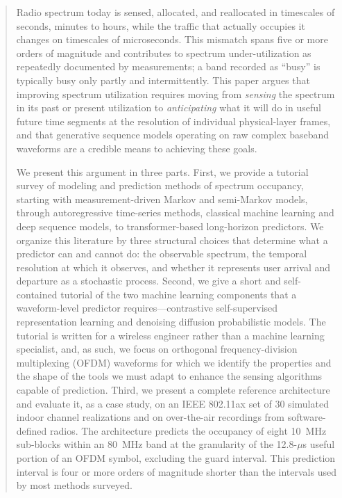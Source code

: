 \documentclass[lettersize,journal]{IEEEtran}
\begin{document}
\begin{abstract}
Radio spectrum today is sensed, allocated, and reallocated in timescales of
seconds, minutes to hours, while the traffic that actually occupies it changes on
timescales of microseconds. This mismatch spans five or more orders of
magnitude and contributes to spectrum under-utilization as repeatedly
documented by measurements; a band recorded as ``busy'' is
typically busy only partly and intermittently. This paper argues
that improving spectrum utilization requires moving from \emph{sensing}
the spectrum in its past or present utilization to \emph{anticipating} what it
will do in useful future time segments at the resolution of individual
physical-layer frames, and that generative sequence models operating on raw
complex baseband waveforms are a credible means to achieving these goals.

We present this argument in three parts. First, we provide a tutorial
survey of modeling and prediction methods of spectrum occupancy, starting
with measurement-driven Markov and semi-Markov models, through
autoregressive time-series methods, classical machine learning and deep
sequence models, to transformer-based long-horizon predictors. We
organize this literature by three structural choices that determine
what a predictor can and cannot do: the observable spectrum, the
temporal resolution at which it observes, and whether it represents user
arrival and departure as a stochastic process. Second, we give a
short and self-contained tutorial of the two machine learning
components that a waveform-level predictor requires---contrastive
self-supervised representation learning and denoising diffusion
probabilistic models. The tutorial is written for a wireless engineer
rather than a machine learning specialist, and, as such, we focus on
orthogonal frequency-division multiplexing (OFDM) waveforms for which we
identify the properties and the shape of the tools we must adapt to enhance the
sensing algorithms capable of prediction. Third, we present a complete
reference architecture and evaluate it, as a case study, on an IEEE 802.11ax
set of 30 simulated indoor channel realizations and on over-the-air
recordings from software-defined radios. The architecture predicts the
occupancy of eight 10~MHz sub-blocks within an 80~MHz band at the
granularity of the 12.8-$\mu$s useful portion of an OFDM symbol, excluding the guard interval. 
This prediction interval is four or more orders of magnitude shorter than 
the intervals used by most methods surveyed.


\end{abstract}
\end{document}
